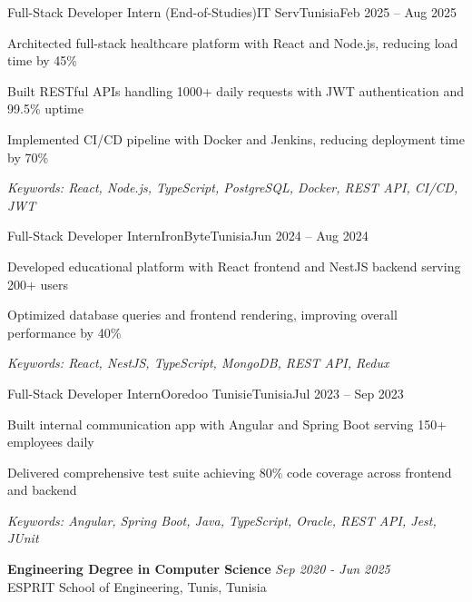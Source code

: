 \documentclass[11pt,a4paper]{article}
\begin{document}
\makecvheader
\makecontactinfo


\begin{internship}{Full-Stack Developer Intern (End-of-Studies)}{IT Serv}{Tunisia}{Feb 2025 -- Aug 2025}{}
  \item Architected full-stack healthcare platform with React and Node.js, reducing load time by 45\%
  \item Built RESTful APIs handling 1000+ daily requests with JWT authentication and 99.5\% uptime
  \item Implemented CI/CD pipeline with Docker and Jenkins, reducing deployment time by 70\%
  \item[] \textit{\footnotesize Keywords: React, Node.js, TypeScript, PostgreSQL, Docker, REST API, CI/CD, JWT}
\end{internship}

\begin{internship}{Full-Stack Developer Intern}{IronByte}{Tunisia}{Jun 2024 -- Aug 2024}{}
  \item Developed educational platform with React frontend and NestJS backend serving 200+ users
  \item Optimized database queries and frontend rendering, improving overall performance by 40\%
  \item[] \textit{\footnotesize Keywords: React, NestJS, TypeScript, MongoDB, REST API, Redux}
\end{internship}

\begin{internship}{Full-Stack Developer Intern}{Ooredoo Tunisie}{Tunisia}{Jul 2023 -- Sep 2023}{}
  \item Built internal communication app with Angular and Spring Boot serving 150+ employees daily
  \item Delivered comprehensive test suite achieving 80\% code coverage across frontend and backend
  \item[] \textit{\footnotesize Keywords: Angular, Spring Boot, Java, TypeScript, Oracle, REST API, Jest, JUnit}
\end{internship}

\textbf{Engineering Degree in Computer Science} \hfill \textit{Sep 2020 - Jun 2025}\\[-2pt]
ESPRIT School of Engineering, Tunis, Tunisia
\end{document}
